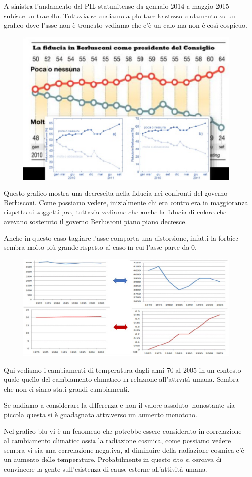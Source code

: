 \documentclass[12pt,a4paper]{report}
\begin{document}
A sinistra l'andamento del PIL statunitense da gennaio 2014 a maggio 2015 subisce un tracollo. Tuttavia se andiamo a plottare lo stesso andamento su un grafico dove l'asse non è troncato vediamo che c'è un calo ma non è così cospicuo. 

\begin{figure} [h]
	\centering
	\includegraphics[width=0.4\linewidth]{"imgs datavis/berlusca"}
	\caption{}
	\label{fig:berlusca}
\end{figure}

Questo grafico mostra una decrescita nella fiducia nei confronti del governo Berlusconi. Come possiamo vedere, inizialmente chi era contro era in maggioranza rispetto ai soggetti pro, tuttavia vediamo che anche la fiducia di coloro che avevano sostenuto il governo Berlusconi piano piano decresce. 

Anche in questo caso tagliare l'asse comporta una distorsione, infatti la forbice sembra molto più grande rispetto al caso in cui l'asse parte da 0. 

\begin{figure}[h]
	\centering
	\includegraphics[width=0.5\linewidth]{"imgs datavis/gradi"}
	\caption{}
	\label{fig:gradi}
\end{figure}

Qui vediamo i cambiamenti di temperatura dagli anni 70 al 2005 in un contesto quale quello del cambiamento climatico in relazione all'attività umana. Sembra che non ci siano stati grandi cambiamenti. 

Se andiamo a considerare la differenza e non il valore assoluto, nonostante sia piccola questa si è guadagnata attraverso un aumento monotono. 

Nel grafico blu vi è un fenomeno che potrebbe essere considerato in correlazione al cambiamento climatico ossia la radiazione cosmica, come possiamo vedere sembra vi sia una correlazione negativa, al diminuire della radiazione cosmica c'è un aumento delle temperature. Probabilmente in questo sito si cercava di convincere la gente sull'esistenza di cause esterne all'attività umana. 
\end{document}
